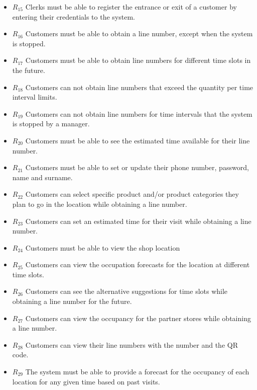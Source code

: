 \begin{itemize}
    \item \textbf{$R_{15}$} Clerks must be able to register the entrance or exit of a customer by entering their credentials to the system.
    \item \textbf{$R_{16}$} Customers must be able to obtain a line number, except when the system is stopped.
    \item \textbf{$R_{17}$} Customers must be able to obtain line numbers for different time slots in the future.
    \item \textbf{$R_{18}$} Customers can not obtain line numbers that exceed the quantity per time interval limits.
    \item \textbf{$R_{19}$} Customers can not obtain line numbers for time intervals that the system is stopped by a manager.
    \item \textbf{$R_{20}$} Customers must be able to see the estimated time available for their line number.
    \item \textbf{$R_{21}$} Customers must be able to set or update their phone number, password, name and surname.
    \item \textbf{$R_{22}$} Customers can select specific product and/or product categories they plan to go in the location while obtaining a line number.
    \item \textbf{$R_{23}$} Customers can set an estimated time for their visit while obtaining a line number.
    \item \textbf{$R_{24}$} Customers must be able to view the shop location
    \item \textbf{$R_{25}$} Customers can view the occupation forecasts for the location at different time slots.
    \item \textbf{$R_{26}$} Customers can see the alternative suggestions for time slots while obtaining a line number for the future.
    \item \textbf{$R_{27}$} Customers can view the occupancy for the partner stores while obtaining a line number.
    \item \textbf{$R_{28}$} Customers can view their line numbers with the number and the QR code.
    \item \textbf{$R_{29}$} The system must be able to provide a forecast for the occupancy of each location for any given time based on past visits.
\end{itemize}

